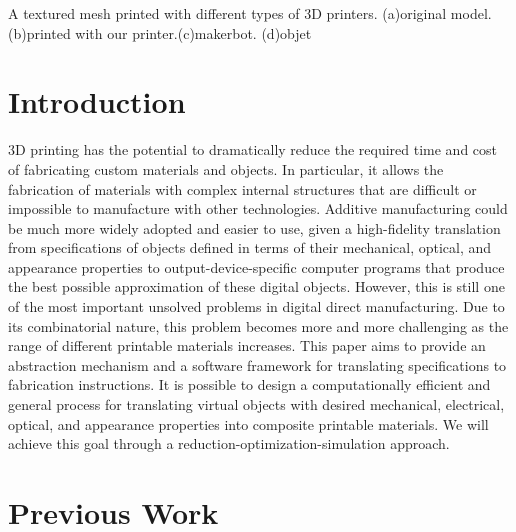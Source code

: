 \documentclass[annual]{acmsiggraph}
\begin{document}
{\begin{subfigure}[b]{0.18\textwidth}
                \caption{}
                \label{teaser:objet}
        \end{subfigure}
        \caption{A textured mesh printed with different types of 3D printers.
        	(a)original model.(b)printed with our printer.(c)makerbot.
        	(d)objet}\label{teaser}
	\label{fig:texture}
 }

\maketitle

\begin{abstract}


\end{abstract}

\keywordlist

\TOGlinkslist

\copyrightspace

\section{Introduction}
3D printing has the potential to dramatically reduce the required time and cost of
fabricating custom materials and objects. In particular, it allows the fabrication of materials with complex internal
structures that are difficult or impossible to manufacture with other technologies. Additive manufacturing could be
much more widely adopted and easier to use, given a high-fidelity translation from specifications of objects defined
in terms of their mechanical, optical, and appearance properties to output-device-specific computer
programs that produce the best possible approximation of these digital objects. However, this is still one of
the most important unsolved problems in digital direct manufacturing. Due to its combinatorial nature, this
problem becomes more and more challenging as the range of different printable materials increases. This paper
aims to provide an abstraction mechanism and a software framework for translating specifications to fabrication
instructions. It is possible to design a computationally efficient and general process for translating virtual objects
with desired mechanical, electrical, optical, and appearance properties into composite printable materials.
We will achieve this goal through a reduction-optimization-simulation approach.
\section{Previous Work}
\end{document}

